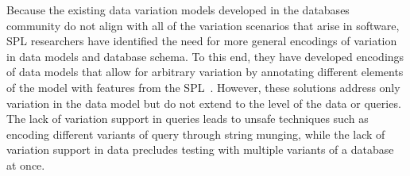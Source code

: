 Because the existing data variation models developed in the databases community
do not align with all of the variation scenarios that arise in software, SPL
researchers have identified the need for more general encodings of variation in
data models and database schema. To this end, they have developed
encodings of data models that allow for arbitrary variation by annotating
different elements of the model with features from the
SPL~\cite{skrhas09DBIS,slrs12CAiSE,ad11varDataModel}.
%
However, these solutions address only variation in the data model but do not
extend to the level of the data or queries. The lack of variation support in
queries leads to unsafe techniques such as encoding different variants of query
through string munging, while the lack of variation support in data precludes
testing with multiple variants of a database at once.

